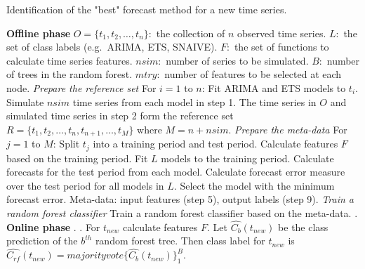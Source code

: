 \documentclass[11pt,a4paper,]{article}
\theoremstyle{definition}
\theoremstyle{definition}
\theoremstyle{definition}
\theoremstyle{remark}
\begin{document}
\begin{algorithm}[!hb]
  \caption{Identification of the "best" forecast method for a new time series.}
  \label{alg:algo-lab}
  \begin{algorithmic}[1]
    \Statex \textbf{Offline phase}
    \Statex {}
    \Statex \hspace{1cm}$O=\{t_1, t_2, \dots,t_n\}:$ the collection of $n$ observed time series.
      \Statex \hspace{1cm}$L:$ the set of class labels (e.g.\ ARIMA, ETS, SNAIVE).
         \Statex \hspace{1cm}$F:$ the set of functions to calculate time series features.
         \Statex \hspace{1cm}$nsim:$ number of series to be simulated.
         \Statex \hspace{1cm}$B:$ number of trees in the random forest.
         \Statex \hspace{1cm}$mtry:$ number of features to be selected at each node.
     \Statex {}
      \Statex \hspace{1cm} 
      \Statex
     \Statex \textit{Prepare the reference set}
    \Statex For $i=1$ to $n$:
            \State Fit ARIMA and ETS models to $t_i$.
            \State Simulate $nsim$ time series from each model in step 1.
            \State The time series in $O$ and simulated time series in step 2 form the reference set $R=\{t_1, t_2, \dots,t_n, t_{n+1},\dots,t_M\}$ where $M = n + nsim$.
    \Statex 
    \Statex \textit{Prepare the meta-data}
    \Statex For $j=1$ to $M$:
            \State Split $t_j$ into a training period and test period.
            \State Calculate features $F$ based on the training period. 
            \State Fit $L$ models to the training period.
            \State Calculate forecasts for the test period from each model.
            \State Calculate forecast error measure over the test period for all models in $L$.
            \State Select the model with the minimum forecast error.
            \State Meta-data: input features (step 5), output labels (step 9).
     \Statex
    \Statex \textit{Train a random forest classifier}
            \State Train a random forest classifier based on the meta-data.
            . 
    \Statex
     \Statex \textbf{Online phase}
    \Statex {}
    \Statex \hspace{1cm} .
     \Statex {}
      \Statex \hspace{1cm}.
  \State For $t_{new}$ calculate features $F$.
  \State Let $\hat{C_b}(t_{new})$ be the class prediction of the $b^{th}$ random forest tree. Then class label for $t_{new}$ is $\hat{C_{rf}}(t_{new})=majorityvote\{\hat{C_b}(t_{new})\}_1^B$.
   \end{algorithmic}
\end{algorithm}
\end{document}
